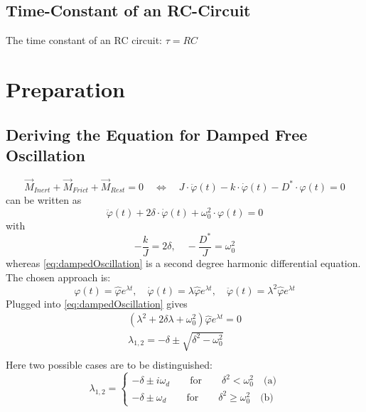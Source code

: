     \subsection*{Time-Constant of an RC-Circuit}
        The time constant of an RC circuit: \(\tau = RC\)
\section{Preparation}
%
    \subsection{Deriving the Equation for Damped Free Oscillation}\label{sec:preparation_task_1}
        \begin{equation}
            \vec{M}_{ Inert } + \vec{M}_{ Frict } + \vec{ M}_{ Rest } = 0 \quad \Leftrightarrow \quad J \cdot \ddot\varphi(t) - k \cdot \dot\varphi(t) - D^* \cdot \varphi(t) = 0
        \end{equation}
        can be written as
        \begin{equation}
            \ddot\varphi(t) + 2 \delta \cdot \dot\varphi(t) + \omega_0^2 \cdot \varphi(t) = 0
            \label{eq:dampedOscillation}
        \end{equation}
        with
        \begin{equation}
            -\frac{k}{J} = 2\delta, \quad -\frac{D^*}{J} = \omega_0^2
            \label{eq:DEParameters}
        \end{equation}
        whereas \cref{eq:dampedOscillation} is a second degree harmonic differential equation.
        The chosen approach is:
        \begin{equation}
            \varphi(t) = \hat{\varphi} e^{\lambda t}, \quad \dot{\varphi}(t) = \lambda \hat{\varphi} e^{\lambda t}, \quad \ddot{\varphi}(t) = \lambda^2 \hat{\varphi} e^{\lambda t}
        \end{equation}
        Plugged into \cref{eq:dampedOscillation} gives
        \begin{align}
            \left(\lambda^2 + 2\delta \lambda + \omega_0^2\right) \hat{\varphi}e^{\lambda t} = 0 \nonumber \\
            \lambda_{1,2} = -\delta \pm \sqrt{\delta^2-\omega_0^2} \nonumber \\
        \end{align}
        Here two possible cases are to be distinguished:
        \begin{equation}
            \lambda_{1,2} =
            \begin{cases}
                    -\delta \pm i\omega_d \qquad \text{for} \qquad \delta^2 < \omega_0^2 \quad \text{(a)}\\
                    -\delta \pm \omega_d \qquad \text{for} \qquad \delta^2 \geq \omega_0^2 \quad \text{(b)}
            \end{cases}
        \end{equation}
